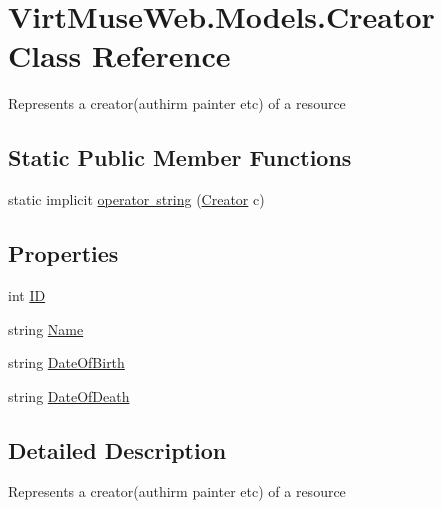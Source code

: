 \hypertarget{class_virt_muse_web_1_1_models_1_1_creator}{}\section{Virt\+Muse\+Web.\+Models.\+Creator Class Reference}
\label{class_virt_muse_web_1_1_models_1_1_creator}


Represents a creator(authirm painter etc) of a resource  


\subsection*{Static Public Member Functions}
\begin{DoxyCompactItemize}
\item 
static implicit \mbox{\hyperlink{class_virt_muse_web_1_1_models_1_1_creator_ad3d2833de2c44e05455711b8a987bcfb}{operator string}} (\mbox{\hyperlink{class_virt_muse_web_1_1_models_1_1_creator}{Creator}} c)
\end{DoxyCompactItemize}
\subsection*{Properties}
\begin{DoxyCompactItemize}
\item 
int \mbox{\hyperlink{class_virt_muse_web_1_1_models_1_1_creator_a540ba648434a7b62cec37a82742a2896}{ID}}
\item 
string \mbox{\hyperlink{class_virt_muse_web_1_1_models_1_1_creator_a4ebb4ac1c0dede1965066e5dc9c13061}{Name}}
\item 
string \mbox{\hyperlink{class_virt_muse_web_1_1_models_1_1_creator_acfafda84c90f8164b8fcc65264209881}{Date\+Of\+Birth}}
\item 
string \mbox{\hyperlink{class_virt_muse_web_1_1_models_1_1_creator_a2d4c062cfd1e12ffc9cb918f476360d7}{Date\+Of\+Death}}
\end{DoxyCompactItemize}


\subsection{Detailed Description}
Represents a creator(authirm painter etc) of a resource 



